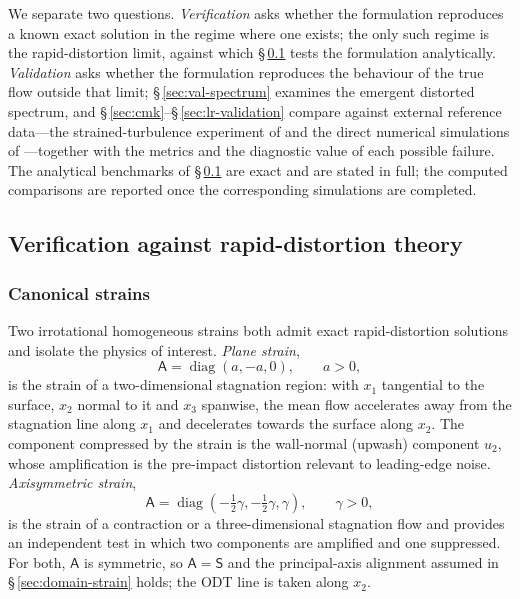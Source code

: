 \documentclass[lineno]{JFM-FLM_Au}
\begin{document}
We separate two questions. \emph{Verification} asks whether the
formulation reproduces a known exact solution in the regime where one
exists; the only such regime is the rapid-distortion limit, against which
\S\,\ref{sec:verification} tests the formulation analytically. \emph{Validation}
asks whether the formulation reproduces the behaviour of the true flow
outside that limit; \S\,\ref{sec:val-spectrum} examines the emergent
distorted spectrum, and \S\,\ref{sec:cmk}--\S\,\ref{sec:lr-validation}
compare against external reference data---the strained-turbulence experiment
of \citet{ChenMeneveauKatz2006} and the direct numerical simulations of
\citet{LeeReynolds1985}---together with the metrics and the diagnostic value
of each possible failure. The analytical benchmarks of
\S\,\ref{sec:verification} are exact and are stated in full; the computed
comparisons are reported once the corresponding simulations are completed.

\subsection{Verification against rapid-distortion theory}\label{sec:verification}

\subsubsection{Canonical strains}

Two irrotational homogeneous strains both admit exact rapid-distortion
solutions and isolate the physics of interest. \emph{Plane strain},
\begin{equation}
  \mathsf{A}=\operatorname{diag}(a,-a,0),\qquad a>0,
  \label{eq:plane-strain}
\end{equation}
is the strain of a two-dimensional stagnation region: with $x_1$ tangential
to the surface, $x_2$ normal to it and $x_3$ spanwise, the mean flow
accelerates away from the stagnation line along $x_1$ and decelerates
towards the surface along $x_2$. The component compressed by the strain is
the wall-normal (upwash) component $u_2$, whose amplification is the
pre-impact distortion relevant to leading-edge noise. \emph{Axisymmetric
strain},
\begin{equation}
  \mathsf{A}=\operatorname{diag}(-\tfrac12\gamma,-\tfrac12\gamma,\gamma),
  \qquad \gamma>0,
  \label{eq:axi-strain}
\end{equation}
is the strain of a contraction or a three-dimensional stagnation flow and
provides an independent test in which two components are amplified and one
suppressed. For both, $\mathsf{A}$ is symmetric, so $\mathsf{A}=\mathsf{S}$
and the principal-axis alignment assumed in \S\,\ref{sec:domain-strain}
holds; the ODT line is taken along $x_2$.
\end{document}
